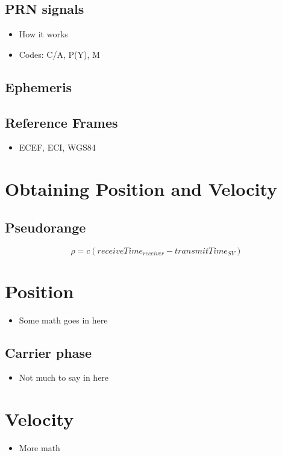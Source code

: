 \subsection{PRN signals}
\begin{itemize}
\item How it works
\item Codes: C/A, P(Y), M
\end{itemize}

\subsection{Ephemeris}

\subsection{Reference Frames}
\begin{itemize}
\item ECEF, ECI, WGS84
\end{itemize}

\section{Obtaining Position and Velocity}

\subsection{Pseudorange}

%
\[\rho = c (receiveTime_{receiver} - transmitTime_{SV})\]
%

\section{Position}
\begin{itemize}
\item Some math goes in here
\end{itemize}

\subsection{Carrier phase}
\begin{itemize}
\item Not much to say in here
\end{itemize}

\section{Velocity}
\begin{itemize}
\item More math
\end{itemize}

